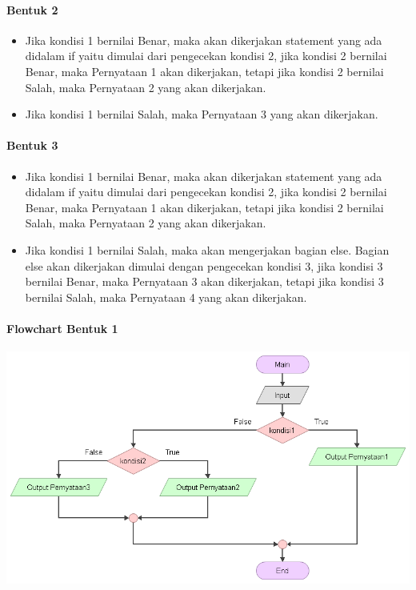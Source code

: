 \documentclass[a4paper,12pt]{article}
\begin{document}
\paragraph{Bentuk 2}
\begin{itemize}
	\item Jika kondisi 1 bernilai Benar, maka akan dikerjakan statement yang ada didalam
	if yaitu dimulai dari pengecekan kondisi 2, jika kondisi 2 bernilai Benar, maka
	Pernyataan 1 akan dikerjakan, tetapi jika kondisi 2 bernilai Salah, maka
	Pernyataan 2 yang akan dikerjakan.
	\item Jika kondisi 1 bernilai Salah, maka Pernyataan 3 yang akan dikerjakan.
\end{itemize}
\paragraph{Bentuk 3}
\begin{itemize}
	\item Jika kondisi 1 bernilai Benar, maka akan dikerjakan statement yang ada didalam
	if yaitu dimulai dari pengecekan kondisi 2, jika kondisi 2 bernilai Benar, maka
	Pernyataan 1 akan dikerjakan, tetapi jika kondisi 2 bernilai Salah, maka
	Pernyataan 2 yang akan dikerjakan.
	\item Jika kondisi 1 bernilai Salah, maka akan mengerjakan bagian else. Bagian else
	akan dikerjakan dimulai dengan pengecekan kondisi 3, jika kondisi 3 bernilai
	Benar, maka Pernyataan 3 akan dikerjakan, tetapi jika kondisi 3 bernilai Salah,
	maka Pernyataan 4 yang akan dikerjakan.
\end{itemize}
\paragraph{Flowchart Bentuk 1\\}
\includegraphics[width=\linewidth]{modimage--011}
\end{document}
